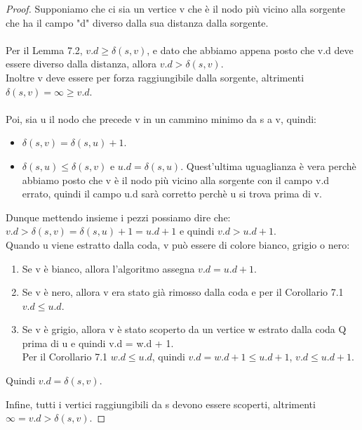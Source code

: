 \documentclass{article}
\begin{document}
\begin{proof}
    Supponiamo che ci sia un vertice v che è il nodo più vicino alla sorgente che ha il campo "d" diverso dalla sua distanza dalla sorgente. \\ \\
    Per il Lemma 7.2, $v.d \geq \delta(s, v)$, e dato che abbiamo appena posto che v.d deve essere diverso dalla distanza, allora $v.d > \delta(s, v)$. \\
    Inoltre v deve essere per forza raggiungibile dalla sorgente, altrimenti $\delta(s, v) = \infty \geq v.d$. \\ \\
    Poi, sia u il nodo che precede v in un cammino minimo da s a v, quindi:
    \begin{itemize}
        \item $\delta(s, v) = \delta(s, u) + 1$.
        \item $\delta(s, u) \leq \delta(s, v)$ e $u.d = \delta(s, u)$. Quest'ultima uguaglianza è vera perchè 
        abbiamo posto che v è il nodo più vicino alla sorgente con il campo v.d errato, quindi il campo u.d sarà corretto perchè u si trova prima di v.
    \end{itemize}
    Dunque mettendo insieme i pezzi possiamo dire che: $v.d > \delta(s, v) = \delta(s, u) + 1 = u.d + 1$ e quindi \underline{$v.d > u.d + 1$}. \\
    Quando u viene estratto dalla coda, v può essere di colore bianco, grigio o nero:
    \begin{enumerate}
        \item Se v è bianco, allora l'algoritmo assegna \underline{$v.d = u.d + 1$}. \lightning
        \item Se v è nero, allora v era stato già rimosso dalla coda e per il Corollario 7.1 \underline{$v.d \leq u.d$}. \lightning
        \item Se v è grigio, allora v è stato scoperto da un vertice w estrato dalla coda Q prima di u e quindi v.d = w.d + 1. \\
        Per il Corollario 7.1 $w.d \leq u.d$, quindi $v.d = w.d + 1 \leq u.d + 1$, \underline{$v.d \leq u.d + 1$}. \lightning
    \end{enumerate}
    \begin{center}
        Quindi $v.d = \delta(s, v)$.
    \end{center}
    Infine, tutti i vertici raggiungibili da s devono essere scoperti, altrimenti $\infty = v.d > \delta(s, v)$.
\end{proof}
\end{document}
